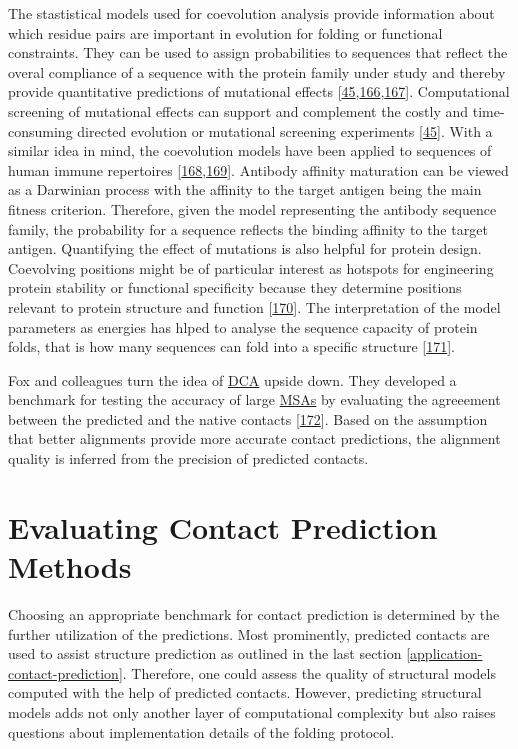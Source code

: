 \documentclass[11pt,a4paper,twoside]{book}
\theoremstyle{definition}
\theoremstyle{definition}
\theoremstyle{remark}
\begin{document}
The stastistical models used for coevolution analysis provide
information about which residue pairs are important in evolution for
folding or functional constraints. They can be used to assign
probabilities to sequences that reflect the overal compliance of a
sequence with the protein family under study and thereby provide
quantitative predictions of mutational effects
{[}\protect\hyperlink{ref-Hopf2017}{45},\protect\hyperlink{ref-Wu2016}{166},\protect\hyperlink{ref-Figliuzzi2015}{167}{]}.
Computational screening of mutational effects can support and complement
the costly and time-consuming directed evolution or mutational screening
experiments {[}\protect\hyperlink{ref-Hopf2017}{45}{]}. With a similar
idea in mind, the coevolution models have been applied to sequences of
human immune repertoires
{[}\protect\hyperlink{ref-Asti2016}{168},\protect\hyperlink{ref-Elhanati2014}{169}{]}.
Antibody affinity maturation can be viewed as a Darwinian process with
the affinity to the target antigen being the main fitness criterion.
Therefore, given the model representing the antibody sequence family,
the probability for a sequence reflects the binding affinity to the
target antigen. Quantifying the effect of mutations is also helpful for
protein design. Coevolving positions might be of particular interest as
hotspots for engineering protein stability or functional specificity
because they determine positions relevant to protein structure and
function {[}\protect\hyperlink{ref-Franceus2016}{170}{]}. The
interpretation of the model parameters as energies has hlped to analyse
the sequence capacity of protein folds, that is how many sequences can
fold into a specific structure
{[}\protect\hyperlink{ref-Tian2017}{171}{]}.

Fox and colleagues turn the idea of \protect\hyperlink{abbrev}{DCA}
upside down. They developed a benchmark for testing the accuracy of
large \protect\hyperlink{abbrev}{MSAs} by evaluating the agreeement
between the predicted and the native contacts
{[}\protect\hyperlink{ref-Fox2016}{172}{]}. Based on the assumption that
better alignments provide more accurate contact predictions, the
alignment quality is inferred from the precision of predicted contacts.

\section{Evaluating Contact Prediction
Methods}\label{intro-cp-evaluation}

Choosing an appropriate benchmark for contact prediction is determined
by the further utilization of the predictions. Most prominently,
predicted contacts are used to assist structure prediction as outlined
in the last section \ref{application-contact-prediction}. Therefore, one
could assess the quality of structural models computed with the help of
predicted contacts. However, predicting structural models adds not only
another layer of computational complexity but also raises questions
about implementation details of the folding protocol.
\end{document}
